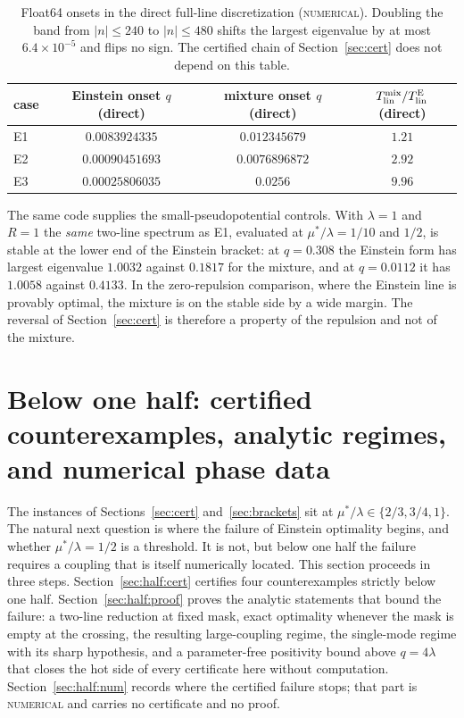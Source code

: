 \documentclass[11pt]{article}
\newcommand{\Tlin}{T_{\mathrm{lin}}}
\newcommand{\muS}{\mu^{*}}
\theoremstyle{definition}
\theoremstyle{remark}
\begin{document}
\begin{table}[t]
\centering
\footnotesize
\setlength{\tabcolsep}{6pt}
\begin{tabular}{@{}lccc@{}}
\toprule
case & Einstein onset $q$ (direct) & mixture onset $q$ (direct) & $\Tlin^{\rm mix}/\Tlin^{\rm E}$ (direct)\\
\midrule
E1 & $0.0083924335$ & $0.012345679$ & $1.21$\\
E2 & $0.00090451693$ & $0.0076896872$ & $2.92$\\
E3 & $0.00025806035$ & $0.0256$ & $9.96$\\
\bottomrule
\end{tabular}
\caption{Float64 onsets in the direct full-line discretization (\textsc{numerical}). Doubling
the band from $|n|\le240$ to $|n|\le480$ shifts the largest eigenvalue by at most
$6.4\times10^{-5}$ and flips no sign. The certified chain of Section~\ref{sec:cert} does not
depend on this table.}
\label{tab:direct}
\end{table}

The same code supplies the small-pseudopotential controls. With $\lambda=1$ and $R=1$ the
\emph{same} two-line spectrum as E1, evaluated at $\muS/\lambda=1/10$ and $1/2$, is stable
at the lower end of the Einstein bracket: at $q=0.308$ the Einstein form has largest
eigenvalue $1.0032$ against $0.1817$ for the mixture, and at $q=0.0112$ it has $1.0058$
against $0.4133$. In the zero-repulsion comparison, where the Einstein line is provably
optimal, the mixture is on the stable side by a wide margin. The reversal of
Section~\ref{sec:cert} is therefore a property of the repulsion and not of the mixture.

\section{Below one half: certified counterexamples, analytic regimes,
and numerical phase data}\label{sec:half}

The instances of Sections~\ref{sec:cert} and~\ref{sec:brackets} sit at
$\muS/\lambda\in\{2/3,3/4,1\}$. The natural next question is where the failure of Einstein
optimality begins, and whether $\muS/\lambda=1/2$ is a threshold. It is not, but below one
half the failure requires a coupling that is itself numerically located. This section
proceeds in three steps. Section~\ref{sec:half:cert} certifies four counterexamples
strictly below one half. Section~\ref{sec:half:proof} proves the analytic statements that
bound the failure: a two-line reduction at fixed mask, exact optimality whenever the mask
is empty at the crossing, the resulting large-coupling regime, the single-mode regime with
its sharp hypothesis, and a parameter-free positivity bound above $q=4\lambda$ that closes
the hot side of every certificate here without computation. Section~\ref{sec:half:num}
records where the certified failure stops; that part is \textsc{numerical} and carries no
certificate and no proof.
\end{document}
